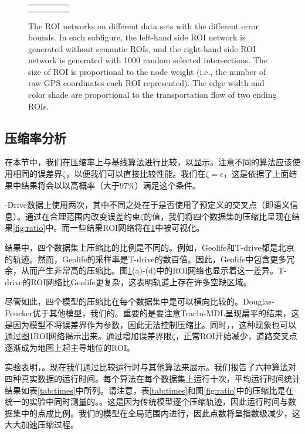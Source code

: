 \begin{figure}[!htb]
\begin{tabular}{ccccc}
{\begin{minipage}[b]{138mm}
\begin{minipage}[b]{101mm}
(g) $\epsilon = 10$ (km)  ~~~~(h) $\epsilon = 30$ (km) ~~~~ (i) $\epsilon = 50$ (km) \\
\end{minipage}
\end{minipage}
}\\
\end{tabular}
\caption{The ROI networks on different data sets with the different error bounds. In each subfigure, the left-hand side ROI network is generated without semantic ROIs, and the right-hand side ROI network is generated with 1000 random selected intersections. The size of ROI is proportional to the node weight (i.e., the number of raw GPS coordinates each ROI represented). The edge width and color shade are proportional to the transportation flow of two ending ROIs. }
\label{fig:illustration}
\end{figure}


\subsection{压缩率分析}
在本节中，我们在压缩率上与基线算法进行比较，以显示。注意不同的算法应该使用相同的误差界$\zeta $，以便我们可以直接比较性能。我们在$\zeta = \epsilon $，这是依据了上面结果中结果将会以以高概率（大于$97\%$）满足这个条件。

-Drive数据上使用两次，其中不同之处在于是否使用了预定义的交叉点（即语义信息）。通过在合理范围内改变误差约束$ \zeta $的值，我们将四个数据集的压缩比呈现在结果\ref{fig:ratio}中。而一些结果ROI网络将在\ref{fig:illustration}中被可视化。

结果中，四个数据集上压缩比的比例是不同的。例如，Geolife和T-drive都是北京的轨迹。然而，Geolife的采样率是T-drive的数百倍。因此，Geolife中包含更多冗余，从而产生非常高的压缩比。图\ref{fig:illustration}(a)-(d)中的ROI网络也显示着这一差异。T-drive的ROI网络比Geolife更复杂，这表明轨道上存在许多空缺区域。

尽管如此，四个模型的压缩比在每个数据集中是可以横向比较的。Douglas-Peucker优于其他模型，我们的。重要的是要注意Traclu-MDL呈现扁平的结果，这是因为模型不将误差界作为参数，因此无法控制压缩比。同时，，这种现象也可以通过图\ref{fig:illustration}ROI网络揭示出来。通过增加误差界限$\zeta$，正常ROI开始减少，道路交叉点逐渐成为地图上起主导地位的ROI。

实验表明，。现在我们通过比较运行时与其他算法来展示。我们报告了六种算法对四种真实数据的运行时间。每个算法在每个数据集上运行十次，平均运行时间统计结果如表\ref{tab:times}中所列。请注意，表\ref{tab:times}和图\ref{fig:ratio}中的压缩比是在统一的实验中同时测量的。。这是因为传统模型逐个压缩轨迹，因此运行时间与数据集中的点成比例。我们的模型在全局范围内进行，因此点数将呈指数级减少，这大大加速压缩过程。




